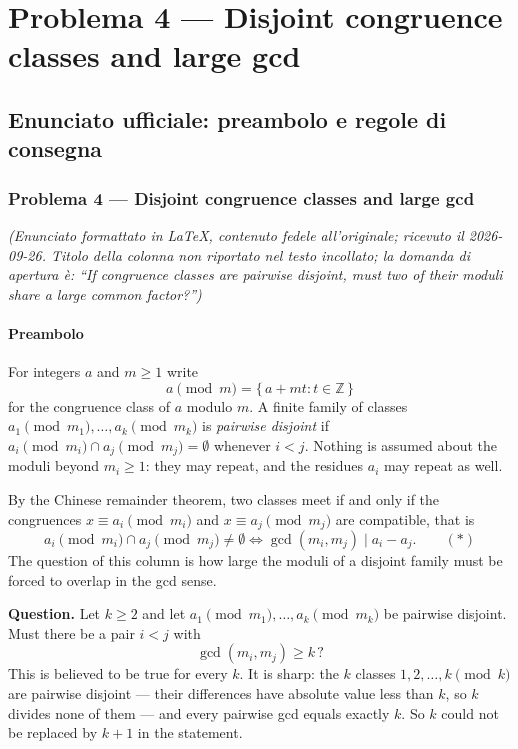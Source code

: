 \documentclass[11pt,a4paper]{article}
\begin{document}
\section{Problema 4 — Disjoint congruence classes and large gcd}
\subsection{Enunciato ufficiale: preambolo e regole di consegna}
\subsubsection{Problema 4 --- Disjoint congruence classes and large
gcd}\label{problema-4-disjoint-congruence-classes-and-large-gcd}

\emph{(Enunciato formattato in LaTeX, contenuto fedele all'originale;
ricevuto il 2026-09-26. Titolo della colonna non riportato nel testo
incollato; la domanda di apertura è: ``If congruence classes are
pairwise disjoint, must two of their moduli share a large common
factor?'')}

\paragraph{Preambolo}\label{preambolo}

For integers \(a\) and \(m \ge 1\) write \[
a \pmod m = \{\, a + mt : t \in \mathbb{Z} \,\}
\] for the congruence class of \(a\) modulo \(m\). A finite family of
classes \(a_1 \pmod{m_1}, \ldots, a_k \pmod{m_k}\) is \emph{pairwise
disjoint} if \(a_i \pmod{m_i} \cap a_j \pmod{m_j} = \emptyset\) whenever
\(i < j\). Nothing is assumed about the moduli beyond \(m_i \ge 1\):
they may repeat, and the residues \(a_i\) may repeat as well.

By the Chinese remainder theorem, two classes meet if and only if the
congruences \(x \equiv a_i \pmod{m_i}\) and \(x \equiv a_j \pmod{m_j}\)
are compatible, that is \[
a_i \pmod{m_i} \cap a_j \pmod{m_j} \ne \emptyset \iff \gcd(m_i, m_j) \mid a_i - a_j. \qquad (*)
\] The question of this column is how large the moduli of a disjoint
family must be forced to overlap in the gcd sense.

\textbf{Question.} Let \(k \ge 2\) and let
\(a_1 \pmod{m_1}, \ldots, a_k \pmod{m_k}\) be pairwise disjoint. Must
there be a pair \(i < j\) with \[
\gcd(m_i, m_j) \ge k \,?
\] This is believed to be true for every \(k\). It is sharp: the \(k\)
classes \(1, 2, \ldots, k \pmod k\) are pairwise disjoint --- their
differences have absolute value less than \(k\), so \(k\) divides none
of them --- and every pairwise gcd equals exactly \(k\). So \(k\) could
not be replaced by \(k+1\) in the statement.
\end{document}
